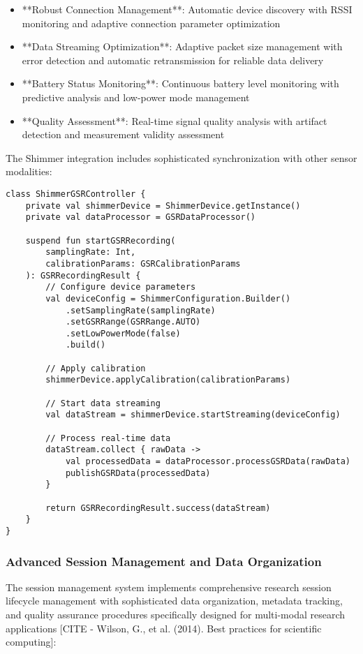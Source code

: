 \documentclass[11pt,a4paper]{report}
\begin{document}
\begin{itemize}
\item **Robust Connection Management**: Automatic device discovery with RSSI monitoring and adaptive connection parameter
  optimization
\item **Data Streaming Optimization**: Adaptive packet size management with error detection and automatic retransmission for
  reliable data delivery
\item **Battery Status Monitoring**: Continuous battery level monitoring with predictive analysis and low-power mode
  management
\item **Quality Assessment**: Real-time signal quality analysis with artifact detection and measurement validity assessment

\end{itemize}
The Shimmer integration includes sophisticated synchronization with other sensor modalities:

\begin{verbatim}
class ShimmerGSRController {
    private val shimmerDevice = ShimmerDevice.getInstance()
    private val dataProcessor = GSRDataProcessor()

    suspend fun startGSRRecording(
        samplingRate: Int,
        calibrationParams: GSRCalibrationParams
    ): GSRRecordingResult {
        // Configure device parameters
        val deviceConfig = ShimmerConfiguration.Builder()
            .setSamplingRate(samplingRate)
            .setGSRRange(GSRRange.AUTO)
            .setLowPowerMode(false)
            .build()

        // Apply calibration
        shimmerDevice.applyCalibration(calibrationParams)

        // Start data streaming
        val dataStream = shimmerDevice.startStreaming(deviceConfig)

        // Process real-time data
        dataStream.collect { rawData ->
            val processedData = dataProcessor.processGSRData(rawData)
            publishGSRData(processedData)
        }

        return GSRRecordingResult.success(dataStream)
    }
}
\end{verbatim}

\subsubsection{Advanced Session Management and Data Organization}

The session management system implements comprehensive research session lifecycle management with sophisticated data
organization, metadata tracking, and quality assurance procedures specifically designed for multi-modal research
applications [CITE - Wilson, G., et al. (2014). Best practices for scientific computing]:
\end{document}

